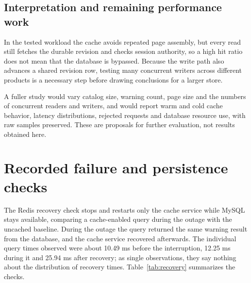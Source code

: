 \subsection{Interpretation and remaining performance work}

In the tested workload the cache avoids repeated page assembly, but every read still fetches the durable revision and checks session authority, so a high hit ratio does not mean that the database is bypassed. Because the write path also advances a shared revision row, testing many concurrent writers across different products is a necessary step before drawing conclusions for a larger store.


A fuller study would vary catalog size, warning count, page size and the numbers of concurrent readers and writers, and would report warm and cold cache behavior, latency distributions, rejected requests and database resource use, with raw samples preserved. These are proposals for further evaluation, not results obtained here.


\FloatBarrier

\section{Recorded failure and persistence checks}

The Redis recovery check stops and restarts only the cache service while MySQL stays available, comparing a cache-enabled query during the outage with the uncached baseline. During the outage the query returned the same warning result from the database, and the cache service recovered afterwards. The individual query times observed were about 10.49 ms before the interruption, 12.25 ms during it and 25.94 ms after recovery; as single observations, they say nothing about the distribution of recovery times. Table~\ref{tab:recovery} summarizes the checks.


